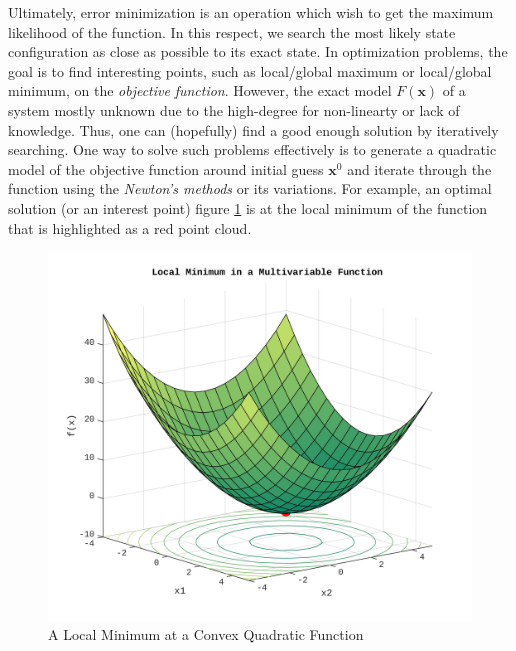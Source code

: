 \documentclass[a4paper]{report}
\numberwithin{figure}{section}
\begin{document}
Ultimately, error minimization is an 
operation which wish to get the maximum likelihood of the function. In this respect, 
we search the most 
likely state configuration as close as possible to its exact state. 
In optimization problems,
the goal is to find interesting points, such as local/global
maximum or local/global minimum, on the \textit{objective}
\textit{function}. However, the exact model $F(\mathbf{x})$ of a system 
mostly unknown due to the high-degree for non-linearty or lack of knowledge.
Thus, one can (hopefully) find a good enough solution by iteratively searching.
One way to solve such problems effectively is to generate a quadratic model of 
the objective function around initial guess $\mathbf{x}^0$ and iterate
through the function using the \textit{Newton's methods} or its variations.
For example,
an optimal solution (or an interest point)
figure \ref{fig:lsq_multivariable_function_example} is at the local
minimum of the function that is highlighted as a red point cloud.



\begin{figure}[H]
	\centering
  \includegraphics[width=0.7\linewidth,natwidth=640,natheight=640]
	{fig/lsq_multivariable_function_example.jpg}
	\caption{A Local Minimum at a Convex Quadratic Function}
	\label{fig:lsq_multivariable_function_example}
\end{figure}
\end{document}
